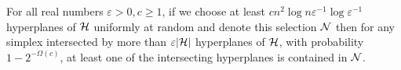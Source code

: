 \begin{theorem}\label{thm:enet}
	For all real numbers $\varepsilon > 0, c \ge 1$, if we choose at least \(c
	n^2 \log n \varepsilon^{-1} \log \varepsilon^{-1} \) hyperplanes of \(\mathcal{H}\)
	uniformly at random and denote this selection \(\mathcal{N}\) then for any simplex
	intersected by more than \(\varepsilon |{\mathcal{H}}|\) hyperplanes of \(\mathcal{H}\),
	with probability $1 - 2^{-\Omega(c)}$, at least one of the intersecting
	hyperplanes is contained in \(\mathcal{N}\).
\end{theorem}
